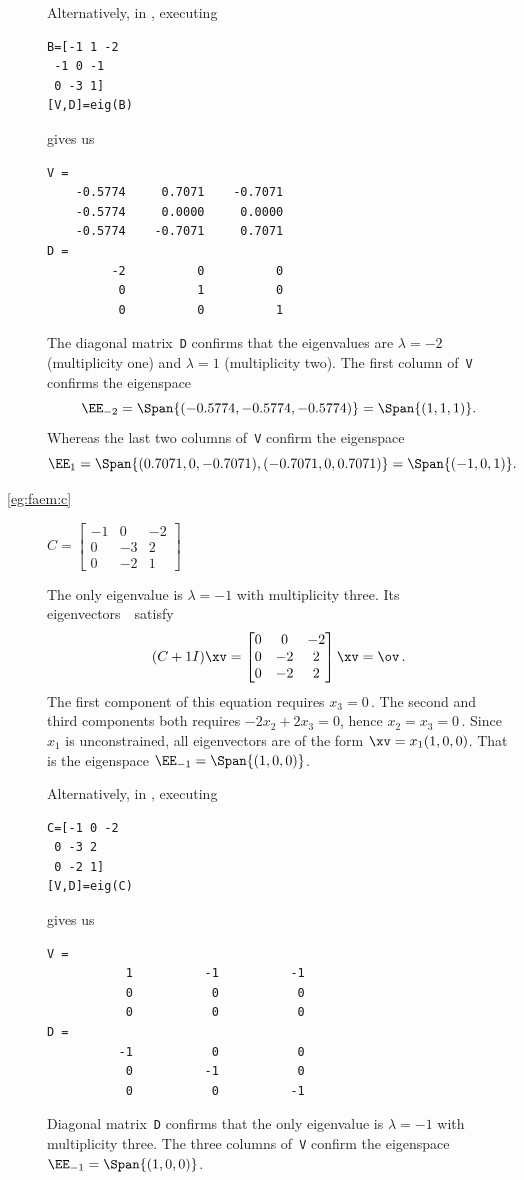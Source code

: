 \begin{example}
\begin{description}
\begin{solution}
Alternatively, in \script, executing 
\begin{verbatim}
B=[-1 1 -2
 -1 0 -1
 0 -3 1]
[V,D]=eig(B)
\end{verbatim}
gives us
\begin{verbatim}
V =
    -0.5774     0.7071    -0.7071
    -0.5774     0.0000     0.0000
    -0.5774    -0.7071     0.7071
D =
         -2          0          0
          0          1          0
          0          0          1
\end{verbatim}
The diagonal matrix~\verb|D| confirms that the eigenvalues are \(\lambda=-2\) (multiplicity one) and \(\lambda=1\) (multiplicity two). 
The first column of~\verb|V| confirms the eigenspace 
\begin{equation*}
\EE_{-2}=\Span\{(-0.5774,-0.5774,-0.5774)\}
=\Span\{(1,1,1)\}.
\end{equation*}
Whereas the last two columns of~\verb|V| confirm the eigenspace 
\begin{equation*}
\EE_1=\Span\{(0.7071,0,-0.7071),(-0.7071,0,0.7071)\}
=\Span\{(-1,0,1)\}.
\end{equation*}
\end{solution}

\item[\ref{eg:faem:c}]
\(C=\begin{bmatrix}-1&0&-2
\\0&-3&2
\\0&-2&1\end{bmatrix}\)
\begin{solution} 
The only eigenvalue is \(\lambda=-1\) with multiplicity three.
Its eigenvectors~\xv\ satisfy
\begin{equation*}
(C+1 I)\xv=\begin{bmatrix} 0&0&-2
\\0&-2&2
\\0&-2&2 \end{bmatrix}\xv=\ov\,.
\end{equation*}
The first component of this equation requires \(x_3=0\)\,.  
The second and third components both requires \(-2x_2+2x_3=0\), hence \(x_2=x_3=0\)\,.
Since \(x_1\) is unconstrained, all eigenvectors are of the form \(\xv=x_1(1,0,0)\).  
That is the eigenspace  \(\EE_{-1}=\Span\{(1,0,0)\}\).

Alternatively, in \script, executing 
\begin{verbatim}
C=[-1 0 -2
 0 -3 2
 0 -2 1]
[V,D]=eig(C)
\end{verbatim}
gives us
\begin{verbatim}
V =
           1          -1          -1
           0           0           0
           0           0           0
D =
          -1           0           0
           0          -1           0
           0           0          -1
\end{verbatim}
Diagonal matrix~\verb|D| confirms that the only eigenvalue is \(\lambda=-1\) with multiplicity three.  
The three columns of~\verb|V| confirm the eigenspace \(\EE_{-1}=\Span\{(1,0,0)\}\).
\end{solution}

\end{description}
\end{example}


